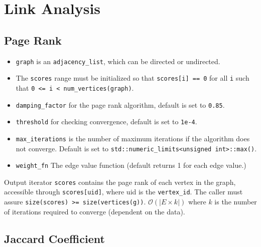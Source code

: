 \section{Link Analysis}
\subsection{Page Rank}
 

{\small
      
}
\begin{itemdescr}
      \pnum\preconditions
      \begin{itemize}
            \item
                  \lstinline{graph} is an \lstinline{adjacency_list}, which can be directed or undirected.
            \item
                  The \lstinline{scores} range must be initialized so that
                  \lstinline{scores[i] == 0}
                  for all \lstinline{i}
                  such that \lstinline{0 <= i < num_vertices(graph)}.
            \item
                  \lstinline{damping_factor} for the page rank algorithm, default is set to \lstinline{0.85}.
            \item
                  \lstinline{threshold} for checking convergence, default is set to \lstinline{1e-4}. 
            \item
                  \lstinline{max_iterations} is the number of maximum iterations if the algorithm does not converge. Default is set to \lstinline{std::numeric_limits<unsigned int>::max()}.
            \item
                  \lstinline{weight_fn} The edge value function (default returns 1 for each edge value.)
      \end{itemize}
      \pnum\effects Output iterator \lstinline{scores} contains the page rank of each vertex in the graph, accessible through \lstinline{scores[uid]}, where uid is the \lstinline{vertex_id}. The caller must assure \lstinline{size(scores) >= size(vertices(g))}.
      \pnum\complexity $\mathcal{O}(|E \times k|)$ where $k$ is the number of iterations required to converge (dependent on the data).
\end{itemdescr}


\subsection{Jaccard Coefficient}


